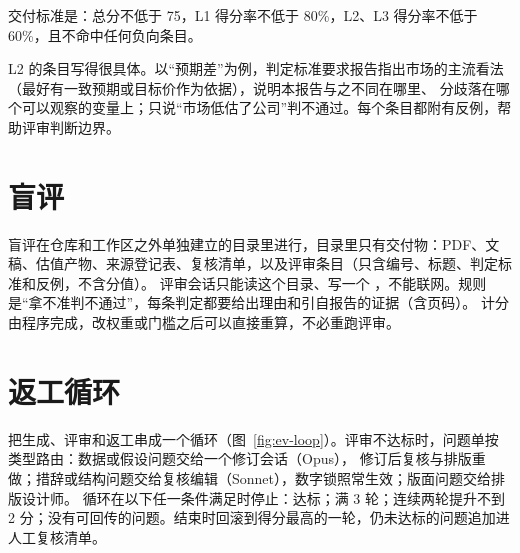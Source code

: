 交付标准是：总分不低于 75，L1 得分率不低于 80\%，L2、L3 得分率不低于 60\%，且不命中任何负向条目。

L2 的条目写得很具体。以“预期差”为例，判定标准要求报告指出市场的主流看法（最好有一致预期或目标价作为依据），说明本报告与之不同在哪里、
分歧落在哪个可以观察的变量上；只说“市场低估了公司”判不通过。每个条目都附有反例，帮助评审判断边界。

\section{盲评}

盲评在仓库和工作区之外单独建立的目录里进行，目录里只有交付物：PDF、文稿、估值产物、来源登记表、复核清单，以及评审条目（只含编号、标题、判定标准和反例，不含分值）。
评审会话只能读这个目录、写一个 ，不能联网。规则是“拿不准判不通过”，每条判定都要给出理由和引自报告的证据（含页码）。
计分由程序完成，改权重或门槛之后可以直接重算，不必重跑评审。

\section{返工循环}

 把生成、评审和返工串成一个循环（图~\ref{fig:ev-loop}）。评审不达标时，问题单按类型路由：数据或假设问题交给一个修订会话（Opus），
修订后复核与排版重做；措辞或结构问题交给复核编辑（Sonnet），数字锁照常生效；版面问题交给排版设计师。
循环在以下任一条件满足时停止：达标；满 3 轮；连续两轮提升不到 2 分；没有可回传的问题。结束时回滚到得分最高的一轮，仍未达标的问题追加进人工复核清单。


